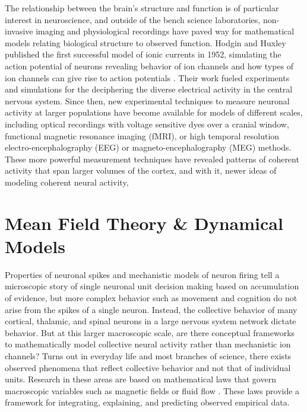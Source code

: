 The relationship between the brain's structure and function is of particular interest in neuroscience, and outside of the bench science laboratories, non-invasive imaging and physiological recordings have paved way for mathematical models relating biological structure to observed function. Hodgin and Huxley published the first successful model of ionic currents in 1952, simulating the action potential of neurons revealing behavior of ion channels and how types of ion channels can give rise to action potentials \cite{hodgkin_quantitative_1952}. Their work fueled experiments and simulations for the deciphering the diverse electrical activity in the central nervous system. Since then, new experimental techniques to measure neuronal activity at larger populations have become available for models of different scales, including optical recordings with voltage sensitive dyes over a cranial window, functional magnetic resonance imaging (fMRI), or high temporal resolution electro-encephalography (EEG) or magneto-encephalography (MEG) methods. These more powerful measurement techniques have revealed patterns of coherent activity that span larger volumes of the cortex, and with it, newer ideas of modeling coherent neural activity,



\section{Mean Field Theory \& Dynamical Models}
Properties of neuronal spikes and mechanistic models of neuron firing tell a microscopic story of single neuronal unit decision making based on accumulation of evidence, but more complex behavior such as movement and cognition do not arise from the spikes of a single neuron. Instead, the collective behavior of many cortical, thalamic, and spinal neurons in a large nervous system network dictate behavior. But at this larger macroscopic scale, are there conceptual frameworks to mathematically model collective neural activity rather than mechanistic ion channels? Turns out in everyday life and most branches of science, there exists observed phenomena that reflect collective behavior and not that of individual units. Research in these areas are based on mathematical laws that govern macroscopic variables such as magnetic fields or fluid flow \cite{haken_introduction_2004,fiedler_coherent_1987}. These laws provide a framework for integrating, explaining, and predicting observed empirical data.

